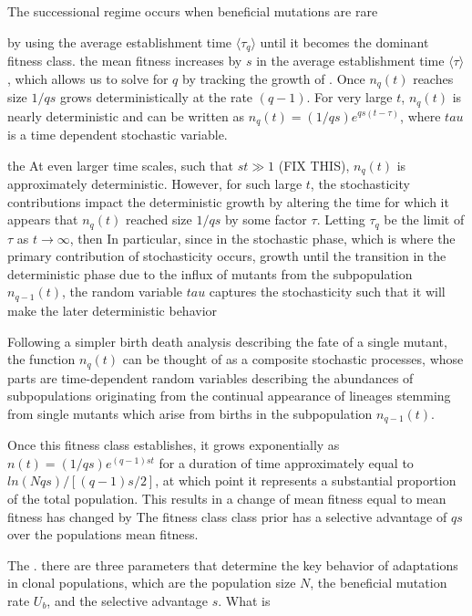 \documentclass[12pt]{article}
\begin{document}
The successional regime occurs when beneficial mutations are rare



by using the average establishment time $\langle \tau_q \rangle$ until it becomes the dominant fitness class.   the mean fitness increases by $s$ in the average establishment time $\langle \tau \rangle$, which allows us to solve for $q$ by tracking the growth of .  Once $n_q(t)$ reaches size $1/qs$ grows deterministically at the rate $(q-1)$.  For very large $t$, $n_q(t)$ is nearly deterministic and can be written as $n_q(t)= (1/qs)e^{qs(t-\tau)}$, where $tau$ is a time dependent stochastic variable.   

the At even larger time scales, such that $st\gg 1$ (FIX THIS), $n_q(t)$ is approximately deterministic.  However, for such large $t$, the stochasticity contributions impact the deterministic growth by altering the time for which it appears that $n_q(t)$ reached size $1/qs$ by some factor $\tau$.  Letting $\tau_q$ be the limit of $\tau$ as $t \rightarrow \infty$, then  In particular, since in the stochastic phase, which is where the primary contribution of stochasticity occurs, growth until the transition in the deterministic phase due to the influx of mutants from the subpopulation $n_{q-1}(t)$, the random variable $tau$ captures the stochasticity such that it will make the later deterministic behavior

Following a simpler birth death analysis describing the fate of a single mutant, the function $n_q(t)$ can be thought of as a composite stochastic processes, whose parts are time-dependent random variables describing the abundances of subpopulations originating from the continual appearance of lineages stemming from single mutants which arise from births in the subpopulation $n_{q-1}(t)$.  

Once this fitness class establishes, it grows exponentially as $n(t)=(1/qs)e^{(q-1)st}$ for a duration of time approximately equal to $ln(Nqs)/[(q-1)s/2]$, at which point it represents a substantial proportion of the total population.  This results in a change of mean fitness equal to  mean fitness has changed by  The fitness class class prior has a selective advantage of $qs$ over the populations mean fitness.

The . there are three parameters that determine the key behavior of adaptations in clonal populations, which are the population size $N$, the beneficial mutation rate $U_b$, and the selective advantage $s$.  What is  
\end{document}
